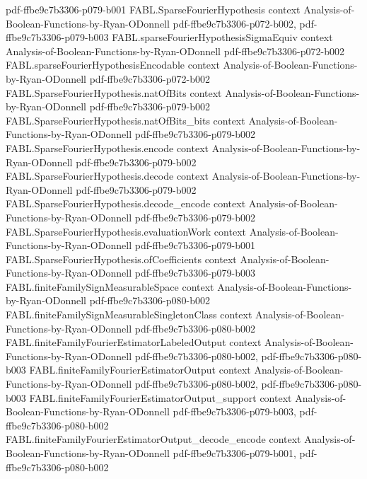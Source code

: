\begin{theorem}
  {pdf-ffbe9c7b3306-p079-b001}
\proofstep
  {FABL.SparseFourierHypothesis}
  {context}
  {Analysis-of-Boolean-Functions-by-Ryan-ODonnell}
  {pdf-ffbe9c7b3306-p072-b002,
    pdf-ffbe9c7b3306-p079-b003}
\proofstep
  {FABL.sparseFourierHypothesisSigmaEquiv}
  {context}
  {Analysis-of-Boolean-Functions-by-Ryan-ODonnell}
  {pdf-ffbe9c7b3306-p072-b002}
\proofstep
  {FABL.sparseFourierHypothesisEncodable}
  {context}
  {Analysis-of-Boolean-Functions-by-Ryan-ODonnell}
  {pdf-ffbe9c7b3306-p072-b002}
\proofstep
  {FABL.SparseFourierHypothesis.natOfBits}
  {context}
  {Analysis-of-Boolean-Functions-by-Ryan-ODonnell}
  {pdf-ffbe9c7b3306-p079-b002}
\proofstep
  {FABL.SparseFourierHypothesis.natOfBits_bits}
  {context}
  {Analysis-of-Boolean-Functions-by-Ryan-ODonnell}
  {pdf-ffbe9c7b3306-p079-b002}
\proofstep
  {FABL.SparseFourierHypothesis.encode}
  {context}
  {Analysis-of-Boolean-Functions-by-Ryan-ODonnell}
  {pdf-ffbe9c7b3306-p079-b002}
\proofstep
  {FABL.SparseFourierHypothesis.decode}
  {context}
  {Analysis-of-Boolean-Functions-by-Ryan-ODonnell}
  {pdf-ffbe9c7b3306-p079-b002}
\proofstep
  {FABL.SparseFourierHypothesis.decode_encode}
  {context}
  {Analysis-of-Boolean-Functions-by-Ryan-ODonnell}
  {pdf-ffbe9c7b3306-p079-b002}
\proofstep
  {FABL.SparseFourierHypothesis.evaluationWork}
  {context}
  {Analysis-of-Boolean-Functions-by-Ryan-ODonnell}
  {pdf-ffbe9c7b3306-p079-b001}
\proofstep
  {FABL.SparseFourierHypothesis.ofCoefficients}
  {context}
  {Analysis-of-Boolean-Functions-by-Ryan-ODonnell}
  {pdf-ffbe9c7b3306-p079-b003}
\proofstep
  {FABL.finiteFamilySignMeasurableSpace}
  {context}
  {Analysis-of-Boolean-Functions-by-Ryan-ODonnell}
  {pdf-ffbe9c7b3306-p080-b002}
\proofstep
  {FABL.finiteFamilySignMeasurableSingletonClass}
  {context}
  {Analysis-of-Boolean-Functions-by-Ryan-ODonnell}
  {pdf-ffbe9c7b3306-p080-b002}
\proofstep
  {FABL.finiteFamilyFourierEstimatorLabeledOutput}
  {context}
  {Analysis-of-Boolean-Functions-by-Ryan-ODonnell}
  {pdf-ffbe9c7b3306-p080-b002,
    pdf-ffbe9c7b3306-p080-b003}
\proofstep
  {FABL.finiteFamilyFourierEstimatorOutput}
  {context}
  {Analysis-of-Boolean-Functions-by-Ryan-ODonnell}
  {pdf-ffbe9c7b3306-p080-b002,
    pdf-ffbe9c7b3306-p080-b003}
\proofstep
  {FABL.finiteFamilyFourierEstimatorOutput_support}
  {context}
  {Analysis-of-Boolean-Functions-by-Ryan-ODonnell}
  {pdf-ffbe9c7b3306-p079-b003,
    pdf-ffbe9c7b3306-p080-b002}
\proofstep
  {FABL.finiteFamilyFourierEstimatorOutput_decode_encode}
  {context}
  {Analysis-of-Boolean-Functions-by-Ryan-ODonnell}
  {pdf-ffbe9c7b3306-p079-b001,
    pdf-ffbe9c7b3306-p080-b002}
\proofstep

\end{theorem}
